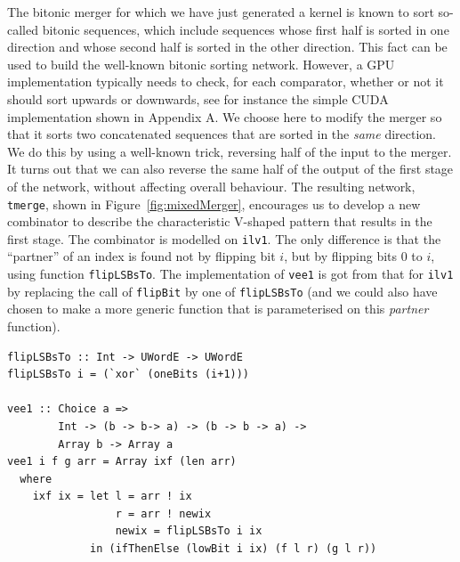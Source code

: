 The bitonic merger for which we have just generated a kernel is known
to sort so-called bitonic sequences, which include sequences whose first
half is sorted in one direction and whose second half is sorted in the other
direction. This fact can be used to build the well-known bitonic sorting
network. However, a GPU implementation typically needs to check, for each comparator,
whether or not it should sort upwards or downwards, see for instance
the simple CUDA implementation shown in Appendix A.
We choose here to modify the merger so that it sorts two concatenated
sequences that are sorted in the {\em same} direction.
We do this by using a well-known trick, reversing half of the input to the merger. It turns out that
we can also reverse the same half of the output of the first stage of
the network, without affecting overall behaviour.
The resulting network, {\tt tmerge}, shown in Figure~\ref{fig:mixedMerger},
encourages us to develop a new combinator to describe the characteristic
V-shaped pattern that results in the first stage.
The combinator is modelled on {\tt ilv1}. The only difference
is that the ``partner'' of an index is found not by flipping bit $i$, but
by flipping bits $0$ to $i$, using function {\tt flipLSBsTo}. The implementation
of {\tt vee1} is got from that for {\tt ilv1} by replacing the call of
{\tt flipBit} by one of {\tt flipLSBsTo} (and we could also have chosen
to make a more generic function that is parameterised on this {\em partner} function).
\begin{codesize}
\begin{verbatim}
flipLSBsTo :: Int -> UWordE -> UWordE
flipLSBsTo i = (`xor` (oneBits (i+1)))

vee1 :: Choice a => 
        Int -> (b -> b-> a) -> (b -> b -> a) -> 
        Array b -> Array a
vee1 i f g arr = Array ixf (len arr)
  where
    ixf ix = let l = arr ! ix
                 r = arr ! newix
                 newix = flipLSBsTo i ix
             in (ifThenElse (lowBit i ix) (f l r) (g l r))
\end{verbatim}
\end{codesize}




